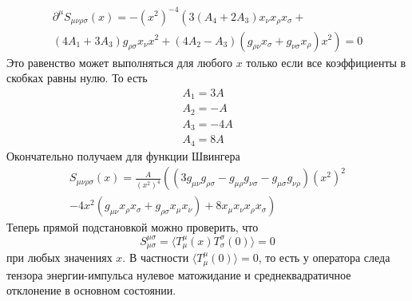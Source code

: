 \documentclass[a4paper,12pt]{article} \usepackage[utf8x]{inputenc} \usepackage[russian]{babel}
\theoremstyle{definition} \newtheorem{corollary}{Corollary}[theorem] \theoremstyle{definition}
\begin{document}
\begin{multline}
  \label{eq:219}
  \partial^{\mu} S_{\mu\nu\rho\sigma}(x)=-(x^{2})^{-4} \left( 3(A_{4}+2 A_{3})
x_{\nu}x_{\rho}x_{\sigma}\right. +\\ \left. (4 A_{1}+3 A_{3}) g_{\rho\sigma} x_{\nu} x^{2} +(4 A_{2}
- A_{3}) (g_{\rho\nu}x_{\sigma}+g_{\nu\sigma}x_{\rho}) x^{2}\right)=0
\end{multline} Это равенство может выполняться для любого $x$ только если все коэффициенты в скобках
равны нулю. То есть
\begin{eqnarray}
  \label{eq:220} A_{1}=3 A\\ A_{2}=-A\\ A_{3}=-4 A\\ A_{4}=8 A
\end{eqnarray} Окончательно получаем для функции Швингера
\begin{multline}
  \label{eq:221} S_{\mu\nu\rho\sigma}(x)=\frac{A}{(x^{2})^{4}} \left( (3g_{\mu\nu}
g_{\rho\sigma}-g_{\mu\rho}g_{\nu\sigma}-g_{\mu\sigma}g_{\nu\rho}) (x^{2})^{2} \right. \\ \left.-4
x^{2} (g_{\mu\nu} x_{\rho}x_{\sigma} +g_{\rho\sigma}x_{\mu}x_{\nu}) +8
x_{\mu}x_{\nu}x_{\rho}x_{\sigma}\right)
\end{multline} Теперь прямой подстановкой можно проверить, что
\begin{equation}
  \label{eq:222} S^{\mu\sigma}_{\mu\sigma}=\langle T^{\mu}_{\mu}(x) T^{\sigma}_{\sigma}(0)\rangle=0
\end{equation} при любых значениях $x$. В частности $\langle T^{\mu}_{\mu}(0)\rangle=0$, то есть у
оператора следа тензора энергии-импульса нулевое матожидание и среднеквадратичное отклонение в
основном состоянии.
\end{document}

